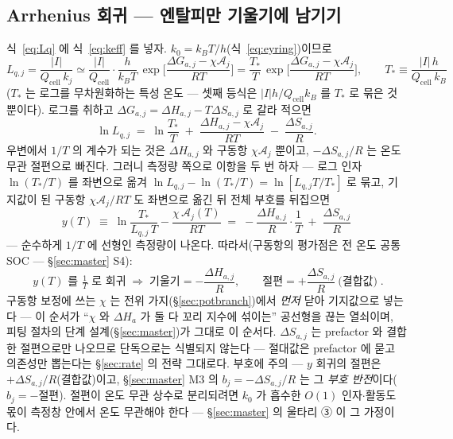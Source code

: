 \documentclass[11pt,a4paper]{article}
\newcommand{\cell}{\mathrm{cell}}
\begin{document}
\subsection{Arrhenius 회귀 — 엔탈피만 기울기에 남기기}
식~\eqref{eq:Lq} 에 식~\eqref{eq:keff} 를 넣자. $k_0=k_BT/h$(식~\eqref{eq:eyring})이므로
\begin{equation}
L_{q,j}=\frac{|I|}{Q_\cell\,k_j}
\simeq\frac{|I|}{Q_\cell}\cdot\frac{h}{k_BT}\,
\exp\!\Big[\frac{\Delta G_{a,j}-\chi\mathcal A_j}{RT}\Big]
=\frac{T_*}{T}\,\exp\!\Big[\frac{\Delta G_{a,j}-\chi\mathcal A_j}{RT}\Big],
\qquad T_*\equiv\frac{|I|\,h}{Q_\cell\,k_B}
\label{eq:LqT}
\end{equation}
($T_*$ 는 로그를 무차원화하는 특성 온도 — 셋째 등식은 $|I|h/Q_\cell k_B$ 를 $T_*$ 로 묶은 것뿐이다).
로그를 취하고 $\Delta G_{a,j}=\Delta H_{a,j}-T\Delta S_{a,j}$ 로 갈라 적으면
\begin{equation}
\ln L_{q,j}\;=\;\ln\frac{T_*}{T}\;+\;\frac{\Delta H_{a,j}-\chi\mathcal A_j}{RT}
\;-\;\frac{\Delta S_{a,j}}{R}.
\label{eq:lnLq}
\end{equation}
우변에서 $1/T$ 의 계수가 되는 것은 $\Delta H_{a,j}$ 와 구동항 $\chi\mathcal A_j$ 뿐이고,
$-\Delta S_{a,j}/R$ 는 온도 무관 절편으로 빠진다. 그러니 측정량 쪽으로 이항을 두 번 하자 — 로그 인자
$\ln(T_*/T)$ 를 좌변으로 옮겨 $\ln L_{q,j}-\ln(T_*/T)=\ln[L_{q,j}T/T_*]$ 로 묶고, 기지값이 된
구동항 $\chi\mathcal A_j/RT$ 도 좌변으로 옮긴 뒤 전체 부호를 뒤집으면
\begin{equation}
y(T)\;\equiv\;\ln\frac{T_*}{L_{q,j}\,T}-\frac{\chi\,\mathcal A_j(T)}{RT}
\;=\;-\frac{\Delta H_{a,j}}{R}\cdot\frac1T\;+\;\frac{\Delta S_{a,j}}{R}
\label{eq:ydef}
\end{equation}
— 순수하게 $1/T$ 에 선형인 측정량이 나온다. 따라서(구동항의 평가점은 전 온도 공통 SOC —
\S\ref{sec:master} S4):
\begin{equation}
\boxed{\;y(T)\text{ 를 }\tfrac1T\text{ 로 회귀}\;\Rightarrow\;
\text{기울기}=-\frac{\Delta H_{a,j}}{R},\qquad
\text{절편}=+\frac{\Delta S_{a,j}}{R}\ \text{(결합값)}\;.}
\label{eq:arrhenius}
\end{equation}
구동항 보정에 쓰는 $\chi$ 는 전위 가지(\S\ref{sec:potbranch})에서 \emph{먼저} 닫아 기지값으로 넣는다 —
이 순서가 ``$\chi$ 와 $\Delta H_a$ 가 둘 다 꼬리 지수에 섞이는'' 공선형을 끊는 열쇠이며, 피팅 절차의
단계 설계(\S\ref{sec:master})가 그대로 이 순서다. $\Delta S_{a,j}$ 는 prefactor 와 결합한 절편으로만
나오므로 단독으로는 식별되지 않는다 — 절대값은 prefactor 에 묻고 의존성만 뽑는다는 \S\ref{sec:rate} 의
전략 그대로다. 부호에 주의 — $y$ 회귀의 절편은 $+\Delta S_{a,j}/R$(결합값)이고, \S\ref{sec:master}
M3 의 $b_j=-\Delta S_{a,j}/R$ 는 그 \emph{부호 반전}이다($b_j=-$절편). 절편이 온도 무관 상수로 분리되려면
$k_0$ 가 흡수한 $O(1)$ 인자$\cdot$활동도 몫이 측정창 안에서 온도 무관해야 한다 — \S\ref{sec:master}
의 울타리 ③ 이 그 가정이다.
\end{document}
